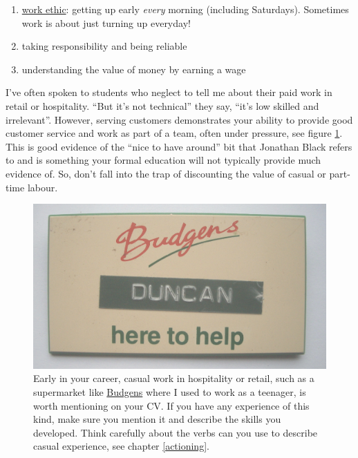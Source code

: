 \documentclass[
]{book}
\providecommand{\tightlist}{%
  \setlength{\itemsep}{0pt}\setlength{\parskip}{0pt}}
\begin{document}
\begin{enumerate}
\def\labelenumi{\arabic{enumi}.}
\tightlist
\item
  \href{https://en.wikipedia.org/wiki/Work_ethic}{work ethic}: getting up early \emph{every} morning (including Saturdays). Sometimes work is about just turning up everyday!
\item
  taking responsibility and being reliable
\item
  understanding the value of money by earning a wage
\end{enumerate}

I've often spoken to students who neglect to tell me about their paid work in retail or hospitality. ``But it's not technical'' they say, ``it's low skilled and irrelevant''. However, serving customers demonstrates your ability to provide good customer service and work as part of a team, often under pressure, see figure \ref{fig:budgens-fig}. This is good evidence of the ``nice to have around'' bit that Jonathan Black refers to \citep{topnotchcv} and is something your formal education will not typically provide much evidence of. So, don't fall into the trap of discounting the value of casual or part-time labour.

\begin{figure}

{\centering \includegraphics[width=1\linewidth]{images/budgens} 

}

\caption{Early in your career, casual work in hospitality or retail, such as a supermarket like \href{https://en.wikipedia.org/wiki/Budgens}{Budgens} where I used to work as a teenager, is worth mentioning on your CV. If you have any experience of this kind, make sure you mention it and describe the skills you developed. Think carefully about the verbs can you use to describe casual experience, see chapter \ref{actioning}.}\label{fig:budgens-fig}
\end{figure}
\end{document}
